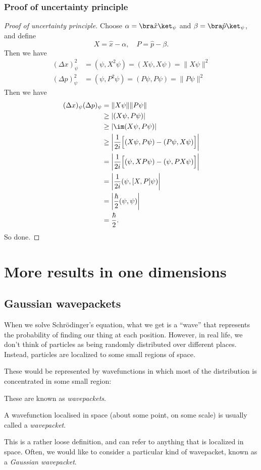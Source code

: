 \documentclass[a4paper]{article}
\begin{document}
\subsubsection*{Proof of uncertainty principle}
\begin{proof}[Proof of uncertainty principle]
  Choose $\alpha = \bra \hat{x}\ket _\psi$ and $\beta = \bra \hat{p}\ket_\psi$, and define
  \[
    X = \hat{x} - \alpha,\quad P = \hat{p} - \beta.
  \]
  Then we have
  \begin{align*}
    (\Delta x)_\psi^2 &= (\psi, X^2 \psi) = (X\psi, X\psi) = \|X\psi\|^2\\
    (\Delta p)_\psi^2 &= (\psi, P^2 \psi) = (P\psi, P\psi) = \|P\psi\|^2
  \end{align*}
  Then we have
  \begin{align*}
    (\Delta x)_\psi (\Delta p)_\psi &= \|X\psi\|\|P\psi\|\\
    &\geq |(X \psi, P \psi)|\\
    &\geq |\im(X \psi, P \psi)|\\
    &\geq \left|\frac{1}{2i}\Big[(X\psi, P\psi) - (P\psi, X\psi)\Big]\right|\\
    &= \left|\frac{1}{2i}\Big[(\psi, XP\psi) - (\psi, PX\psi)\Big]\right|\\
    &= \left|\frac{1}{2i}(\psi, [X, P]\psi)\right|\\
    &= \left|\frac{\hbar}{2}(\psi, \psi)\right|\\
    &= \frac{\hbar}{2}.
  \end{align*}
  So done.
\end{proof}
\section{More results in one dimensions}
\subsection{Gaussian wavepackets}
When we solve Schr\"odinger's equation, what we get is a ``wave'' that represents the probability of finding our thing at each position. However, in real life, we don't think of particles as being randomly distributed over different places. Instead, particles are localized to some small regions of space.

These would be represented by wavefunctions in which most of the distribution is concentrated in some small region:
\begin{center}
\end{center}
These are known as \emph{wavepackets}.
\begin{defi}[Wavepacket]
  A wavefunction localised in space (about some point, on some scale) is usually called a \emph{wavepacket}.
\end{defi}
This is a rather loose definition, and can refer to anything that is localized in space. Often, we would like to consider a particular kind of wavepacket, known as a \emph{Gaussian wavepacket}.
\end{document}
